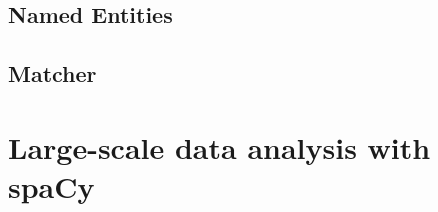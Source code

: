 

\subsection{Named Entities}


\subsection{Matcher}









\section*{Large-scale data analysis with spaCy}




















